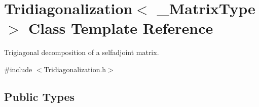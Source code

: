 \hypertarget{class_tridiagonalization}{\section{Tridiagonalization$<$ \-\_\-\-Matrix\-Type $>$ Class Template Reference}
\label{class_tridiagonalization}
}


Trigiagonal decomposition of a selfadjoint matrix.  




{\ttfamily \#include $<$Tridiagonalization.\-h$>$}

\subsection*{Public Types}
